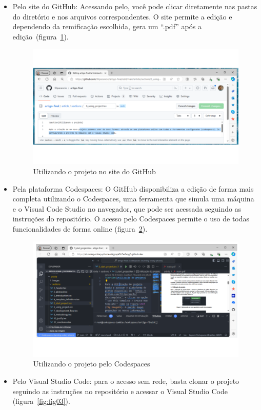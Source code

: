 \begin{itemize}
	\item Pelo  site do GitHub: Acessando pelo, você pode clicar diretamente nas pastas do diretório e nos arquivos correspondentes. O site permite a edição e dependendo da remificação escolhida, gera um ``.pdf'' após a edição~(figura~\ref{fig:fig01}).
	
	\begin{figure}[H]
		\centering
		\includegraphics[width=.6\textwidth]{./images/fig03.png}
		\caption{Utilizando o projeto no site do GitHub}
		\label{fig:fig01}
	\end{figure}

	\item Pela plataforma Codespaces: O GitHub disponibiliza a edição  de forma mais completa utilizando o Codespaces, uma ferramenta que simula uma máquina e o Visual Code Studio no navegador, que pode ser acessada seguindo as instruções do repositório. O acesso pelo Codespaces permite o uso de todas funcionalidades de forma online (figura~\ref{fig:fig02}).
	
	\begin{figure}[H]
		\centering
		\includegraphics[width=.6\textwidth]{./images/fig02.png}
		\caption{Utilizando o projeto pelo Codespaces}
		\label{fig:fig02}
	\end{figure}

	\item Pelo Visual Studio Code: para o acesso sem rede, basta clonar o projeto seguindo as instruções no repositório e acessar o Visual Studio Code (figura~\ref{fig:fig03}).
	

\end{itemize}
